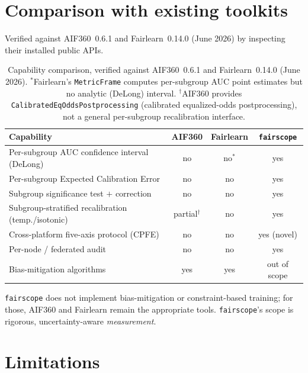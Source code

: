 \documentclass[11pt]{article}
\begin{document}
\section{Comparison with existing toolkits}
\label{sec:compare}

Verified against AIF360~0.6.1 and Fairlearn~0.14.0 (June 2026) by inspecting their installed
public APIs.

\begin{table}[h]
\centering
\begin{tabular}{lccc}
\toprule
Capability & AIF360 & Fairlearn & \texttt{fairscope} \\
\midrule
Per-subgroup AUC confidence interval (DeLong) & no & no$^{*}$ & yes \\
Per-subgroup Expected Calibration Error & no & no & yes \\
Subgroup significance test $+$ correction & no & no & yes \\
Subgroup-stratified recalibration (temp./isotonic) & partial$^{\dagger}$ & no & yes \\
Cross-platform five-axis protocol (CPFE) & no & no & yes (novel) \\
Per-node / federated audit & no & no & yes \\
Bias-mitigation algorithms & yes & yes & out of scope \\
\bottomrule
\end{tabular}
\caption{Capability comparison, verified against AIF360~0.6.1 and Fairlearn~0.14.0
(June 2026). $^{*}$Fairlearn's \texttt{MetricFrame} computes per-subgroup AUC point estimates
but no analytic (DeLong) interval. $^{\dagger}$AIF360 provides
\texttt{CalibratedEqOddsPostprocessing} (calibrated equalized-odds postprocessing), not a
general per-subgroup recalibration interface.}
\end{table}

\texttt{fairscope} does not implement bias-mitigation or constraint-based training; for those,
AIF360 and Fairlearn remain the appropriate tools. \texttt{fairscope}'s scope is rigorous,
uncertainty-aware \emph{measurement}.

\section{Limitations}
\end{document}

